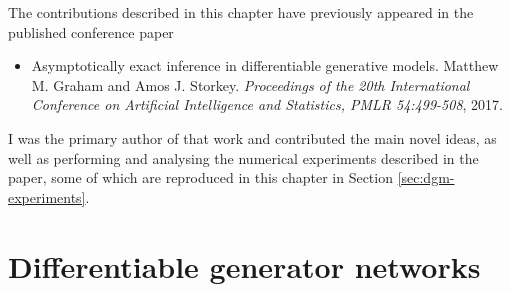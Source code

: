 The contributions described in this chapter have previously appeared in the published conference paper
\begin{itemize}
 \item Asymptotically exact inference in differentiable generative models. Matthew M. Graham and Amos J. Storkey. \emph{Proceedings of the 20th International Conference on Artificial Intelligence and Statistics, PMLR 54:499-508}, 2017.
\end{itemize}
I was the primary author of that work and contributed the main novel ideas, as well as performing and analysing the numerical experiments described in the paper, some of which are reproduced in this chapter in Section \ref{sec:dgm-experiments}.






\section{Differentiable generator networks}

